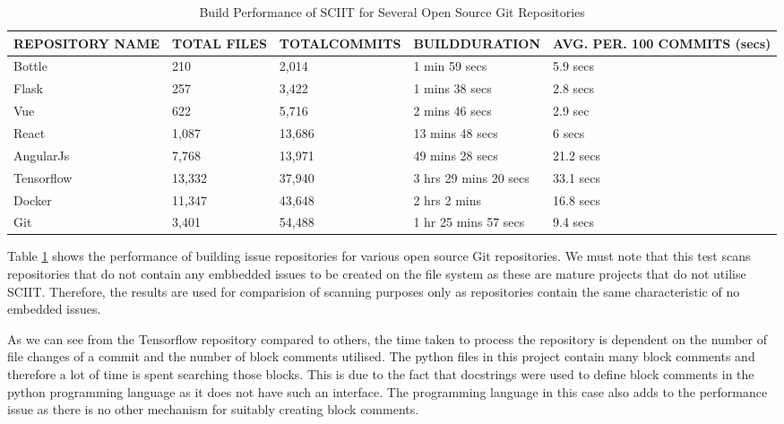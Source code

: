 \documentclass{mproj}
\begin{document}
\begin{table}[h!]
\centering
  \caption{Build Performance of SCIIT for Several Open Source Git Repositories}
  \label{table:build-performance}
  \begin{tabular}{ | p{2.5cm} | p{2.5cm} | p{2.5cm} | p{2.5cm} | p{2.5cm} | }

    \hline
    \textbf{REPOSITORY NAME} & \textbf{TOTAL FILES} & \textbf{TOTAL\newline COMMITS} & \textbf{BUILD\newline DURATION}  & \textbf{AVG. PER. 100 COMMITS (secs)} \\ \hline
    Bottle & 210 & 2,014 & 1 min 59 secs & 5.9 secs \\ \hline
    Flask & 257 & 3,422 & 1 mins 38 secs & 2.8 secs \\ \hline
    Vue & 622 & 5,716 & 2 mins 46 secs & 2.9 sec \\ \hline
    React & 1,087 & 13,686 & 13 mins 48 secs & 6 secs \\ \hline
    AngularJs & 7,768 & 13,971 &  49 mins 28 secs & 21.2 secs \\ \hline
    Tensorflow & 13,332 & 37,940 & 3 hrs 29 mins 20 secs & 33.1 secs \\ \hline
    Docker & 11,347 & 43,648 & 2 hrs 2 mins & 16.8 secs \\ \hline
    Git & 3,401 & 54,488 & 1 hr 25 mins 57 secs & 9.4 secs \\ \hline

  \end{tabular}
\end{table}

Table \ref{table:build-performance} shows the performance of building issue repositories for various open source Git repositories. We must note that this test scans repositories that do not contain any embbedded issues to be created on the file system as these are mature projects that do not utilise SCIIT. Therefore, the results are used for comparision of scanning purposes only as repositories contain the same characteristic of no embedded issues.

As we can see from the Tensorflow repository compared to others, the time taken to process the repository is dependent on the number of file changes of a commit and the number of block comments utilised. The python files in this project contain many block comments and therefore a lot of time is spent searching those blocks. This is due to the fact that docstrings were used to define block comments in the python programming language as it does not have such an interface. The programming language in this case also adds to the performance issue as there is no other mechanism for suitably creating block comments.
\end{document}
